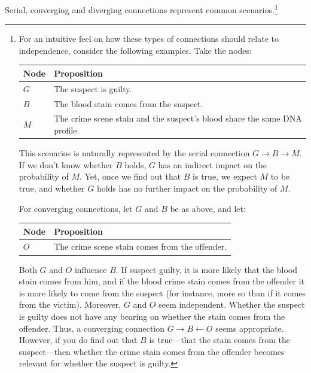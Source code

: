 \documentclass[
  10pt,
  dvipsnames,enabledeprecatedfontcommands]{scrartcl}
\begin{document}
\noindent Serial, converging and diverging connections represent common
scenarios.\footnote{For an intuitive feel on how these types of connections should relate to independence, consider the following examples. Take the nodes:
\footnotesize 
\begin{center}
\begin{tabular}{@{}lp{5.3cm}@{}}\toprule
Node & Proposition \\ \midrule 
$G$ & The suspect is guilty. \\
$B$ & The blood stain comes from the suspect.\\
$M$ & The crime scene stain and the suspect's blood share the same DNA profile.\\
\bottomrule
\end{tabular}
\end{center}
\noindent This scenarios is naturally represented by the serial connection $G \rightarrow B \rightarrow M$. If we don't know whether $B$ holds, $G$ has  an indirect impact on the probability of $M$. Yet, once we find out that $B$ is true, we expect $M$ to be true, and whether $G$ holds has no further impact on the probability of $M$.

For converging connections, let  $G$ and $B$ be as above, and let:

\begin{center}
\begin{tabular}{@{}lp{7.3cm}@{}}\toprule
Node & Proposition \\ \midrule 
$O$ & The crime scene stain comes from the offender.\\
\bottomrule
\end{tabular}
\end{center}

\noindent Both $G$ and $O$ influence $B$. If suspect guilty, it is more likely that the blood stain comes from him, and if the blood crime stain comes from the offender it is more likely to come from the suspect (for instance, more so than if it comes from the victim). Moreover, $G$ and $O$ seem independent. Whether the suspect is guilty does not have any bearing on whether the stain comes from the offender. Thus, a converging connection $G\rightarrow B \leftarrow O$ seems appropriate. However, if you do find out that $B$ is true---that the stain comes from the suspect---then whether the crime stain comes from the offender becomes relevant for whether the suspect is guilty. 

}
\end{document}
